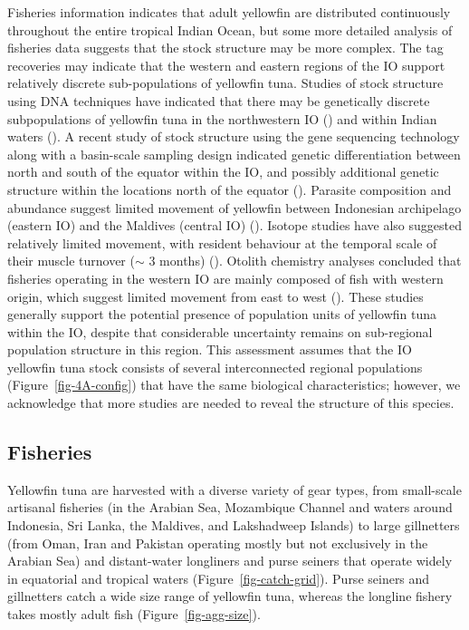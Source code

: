 \documentclass[
]{scrartcl}
\begin{document}
Fisheries information indicates that adult yellowfin are distributed
continuously throughout the entire tropical Indian Ocean, but some more
detailed analysis of fisheries data suggests that the stock structure
may be more complex. The tag recoveries may indicate that the western
and eastern regions of the IO support relatively discrete
sub-populations of yellowfin tuna. Studies of stock structure using DNA
techniques have indicated that there may be genetically discrete
subpopulations of yellowfin tuna in the northwestern IO
() and within Indian waters
(). A
recent study of stock structure using the gene sequencing technology
along with a basin-scale sampling design indicated genetic
differentiation between north and south of the equator within the IO,
and possibly additional genetic structure within the locations north of
the equator (). Parasite composition and abundance suggest limited
movement of yellowfin between Indonesian archipelago (eastern IO) and
the Maldives (central IO)
().
Isotope studies have also suggested relatively limited movement, with
resident behaviour at the temporal scale of their muscle turnover
(\(\sim\) 3 months)
().
Otolith chemistry analyses concluded that fisheries operating in the
western IO are mainly composed of fish with western origin, which
suggest limited movement from east to west
(). These studies generally support the potential
presence of population units of yellowfin tuna within the IO, despite
that considerable uncertainty remains on sub-regional population
structure in this region. This assessment assumes that the IO yellowfin
tuna stock consists of several interconnected regional populations
(Figure~\ref{fig-4A-config}) that have the same biological
characteristics; however, we acknowledge that more studies are needed to
reveal the structure of this species.

\subsection{Fisheries}\label{fisheries}

Yellowfin tuna are harvested with a diverse variety of gear types, from
small-scale artisanal fisheries (in the Arabian Sea, Mozambique Channel
and waters around Indonesia, Sri Lanka, the Maldives, and Lakshadweep
Islands) to large gillnetters (from Oman, Iran and Pakistan operating
mostly but not exclusively in the Arabian Sea) and distant-water
longliners and purse seiners that operate widely in equatorial and
tropical waters (Figure~\ref{fig-catch-grid}). Purse seiners and
gillnetters catch a wide size range of yellowfin tuna, whereas the
longline fishery takes mostly adult fish (Figure~\ref{fig-agg-size}).
\end{document}
